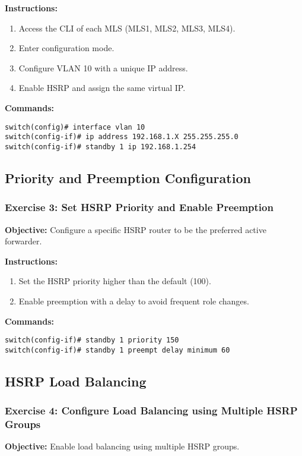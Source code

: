 \documentclass[12pt]{article}
\begin{document}
\textbf{Instructions:}
\begin{enumerate}
\item Access the CLI of each MLS (MLS1, MLS2, MLS3, MLS4).
\item Enter configuration mode.
\item Configure VLAN 10 with a unique IP address.
\item Enable HSRP and assign the same virtual IP.
\end{enumerate}

\textbf{Commands:}
\begin{lstlisting}[style=CiscoCLI]
switch(config)# interface vlan 10
switch(config-if)# ip address 192.168.1.X 255.255.255.0
switch(config-if)# standby 1 ip 192.168.1.254
\end{lstlisting}

\bigskip

\subsection{Priority and Preemption Configuration}

\subsubsection*{Exercise 3: Set HSRP Priority and Enable Preemption}
\textbf{Objective:} Configure a specific HSRP router to be the preferred active forwarder.

\textbf{Instructions:}
\begin{enumerate}
\item Set the HSRP priority higher than the default (100).
\item Enable preemption with a delay to avoid frequent role changes.
\end{enumerate}

\textbf{Commands:}
\begin{lstlisting}[style=CiscoCLI]
switch(config-if)# standby 1 priority 150
switch(config-if)# standby 1 preempt delay minimum 60
\end{lstlisting}

\bigskip

\subsection{HSRP Load Balancing}

\subsubsection*{Exercise 4: Configure Load Balancing using Multiple HSRP Groups}
\textbf{Objective:} Enable load balancing using multiple HSRP groups.
\end{document}
